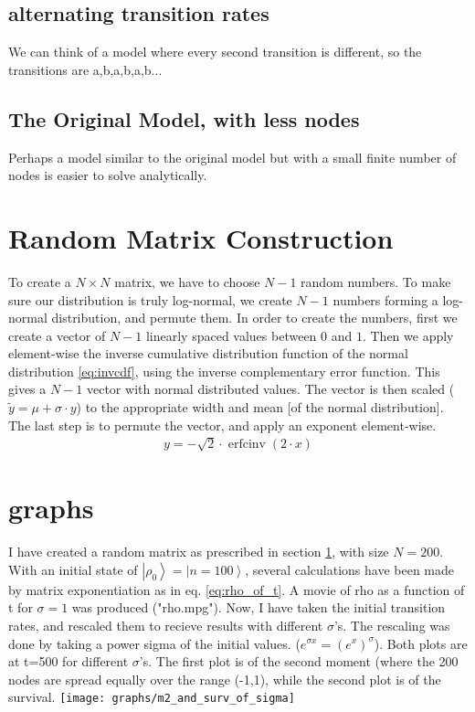 \documentclass[onecolumn,fleqn]{revtex4}
\newcommand{\aket}[1]{\left| #1 \right\rangle}
\begin{document}
\subsection{alternating transition rates}
We can think of a model where every second transition is different, so the transitions are a,b,a,b,a,b...
\subsection{The Original Model, with less nodes}
Perhaps a model similar to the original model but with a small finite number of nodes is easier to solve analytically.

\section{Random Matrix Construction}\label{sec:matrix_construction}
To create a $N\times N$ matrix, we have to choose $N-1$ random numbers. To make sure our distribution is truly log-normal, we create $N-1$ numbers forming a log-normal distribution, and permute them. In order to create the numbers, first we create a vector of $N-1$ linearly spaced values between $0$ and $1$. Then we apply element-wise the inverse cumulative distribution function of the normal distribution \ref{eq:invcdf}, using the inverse complementary error function. This gives a $N-1$ vector with normal distributed values. The vector is then scaled ($\tilde{y} = \mu+\sigma\cdot y$) to the appropriate width and mean [of the normal distribution]. The last step is to permute the vector, and apply an exponent element-wise.
\begin{align}\label{eq:invcdf}
y = -\sqrt{2}\cdot\operatorname{erfcinv}(2\cdot x) 
\end{align}

\section{graphs}
I have created a random matrix as prescribed in section \ref{sec:matrix_construction}, with size $N=200$. With an initial state of $\aket{\rho_0}=\aket{n=100}$, several calculations have been made by matrix exponentiation as in eq. \ref{eq:rho_of_t}. A movie of rho as a function of t for $\sigma=1$ was produced ("rho.mpg"). Now, I have taken the initial transition rates, and rescaled them to recieve results with different $\sigma$'s. The rescaling was done by taking a power sigma of the initial values. ($e^{\sigma x} = {(e^x)}^\sigma$). Both plots are at t=500 for different $\sigma$'s. The first plot is of the second moment (where the 200 nodes are spread equally over the range (-1,1), while the second plot is of the survival.
\texttt{[image: graphs/m2\_and\_surv\_of\_sigma]}


\end{document}
